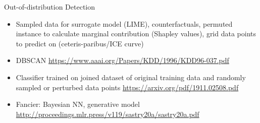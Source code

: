\documentclass[11pt,compress,t,notes=noshow, xcolor=table]{beamer}
\begin{document}
\begin{vbframe}{Out-of-distribution Detection}
	\begin{itemize}
		\item Sampled data for surrogate model (LIME), counterfactuals, permuted instance to calculate marginal contribution (Shapley values), grid data points to predict on (ceteris-paribus/ICE curve)
		\item DBSCAN \url{https://www.aaai.org/Papers/KDD/1996/KDD96-037.pdf}
		\item Classifier trained on joined dataset of original training data and randomly sampled or perturbed data points \url{https://arxiv.org/pdf/1911.02508.pdf}
		\item Fancier: Bayesian NN, generative model \url{http://proceedings.mlr.press/v119/sastry20a/sastry20a.pdf}
	\end{itemize}
\end{vbframe}

\endlecture
\end{document}

